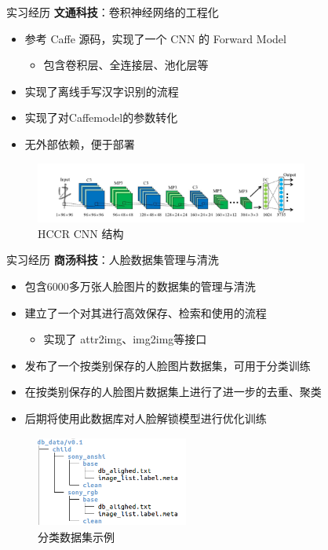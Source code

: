 \documentclass{beamer}
\begin{document}
\begin{frame}{实习经历}
  \textbf{文通科技}：卷积神经网络的工程化
  \begin{itemize}
    \item 参考 Caffe 源码，实现了一个 CNN 的 Forward Model
    \begin{itemize}
      \item 包含卷积层、全连接层、池化层等
    \end{itemize}
    \item 实现了离线手写汉字识别的流程
    \item 实现了对Caffemodel的参数转化
    \item 无外部依赖，便于部署
  \end{itemize}
  \begin{figure}
    \includegraphics[height=2cm,width=9cm]{images/hccr_net.png}
    \caption{HCCR CNN 结构}
  \end{figure} 
\end{frame}


\begin{frame}{实习经历}
  \textbf{商汤科技}：人脸数据集管理与清洗
  \begin{itemize}
    \item 包含6000多万张人脸图片的数据集的管理与清洗
    \item 建立了一个对其进行高效保存、检索和使用的流程
    \begin{itemize}
      \item 实现了 attr2img、img2img等接口
    \end{itemize}
    \item 发布了一个按类别保存的人脸图片数据集，可用于分类训练
    \item 在按类别保存的人脸图片数据集上进行了进一步的去重、聚类
    \item 后期将使用此数据库对人脸解锁模型进行优化训练
  \end{itemize}
  \begin{figure}
    \includegraphics[height=3cm,width=5cm]{images/db_data_w.png}
    \caption{分类数据集示例}
  \end{figure} 
\end{frame}
\end{document}
